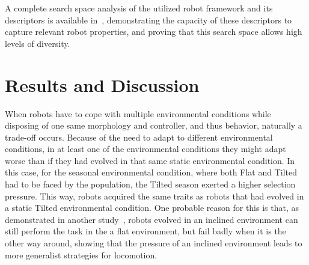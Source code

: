 \documentclass[utf8]{frontiersSCNS} %
\begin{document}
A complete search space analysis of the utilized robot framework and its descriptors is available in~\citep{mirassearch2017, 2miras2018}, demonstrating the capacity of these descriptors to capture relevant robot properties, and proving that this search space allows high levels of diversity.
  
 
    
\section{Results and Discussion}
 
 
When robots have to cope with multiple environmental conditions while disposing of one same morphology and controller, and thus behavior, naturally a trade-off occurs. Because of the need to adapt to different environmental conditions, in at least one of the environmental conditions they might adapt worse than if they had evolved in that same static environmental condition. In this case, for the seasonal environmental condition, where both Flat and Tilted had to be faced by the population, the Tilted season exerted a higher selection pressure. This way, robots acquired the same traits as robots that had evolved in a static Tilted environmental condition. One probable reason for this is that, as demonstrated in another study~\citep{miras2019impact}, robots evolved in an inclined environment can still perform the task in the a flat environment, but fail badly when it is the other way around, showing that the pressure of an inclined environment leads to more generalist strategies for locomotion.
 
\end{document}
